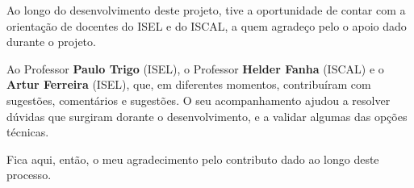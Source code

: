 




Ao longo do desenvolvimento deste projeto, tive a oportunidade de contar com a orientação de docentes do ISEL e do ISCAL, a quem agradeço pelo o apoio dado durante o projeto. 

Ao Professor \textbf{Paulo Trigo} (ISEL), o Professor \textbf{Helder Fanha} (ISCAL) e o \textbf{Artur Ferreira} (ISEL), que, em diferentes momentos, contribuíram com sugestões, comentários e sugestões. O seu acompanhamento ajudou a resolver dúvidas que surgiram dorante o desenvolvimento, e a validar algumas das opções técnicas.

Fica aqui, então, o meu agradecimento pelo contributo dado ao longo deste processo.
